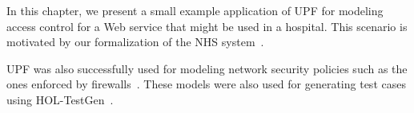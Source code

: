 In this chapter, we present a small example application of UPF for
modeling access control for a Web service that might be used in a
hospital. This scenario is motivated by our formalization of the NHS
system~\cite{bruegger:generation:2012,brucker.ea:model-based:2011}. 

UPF was also successfully used for modeling network security policies
such as the ones enforced by
firewalls~\cite{bruegger:generation:2012,brucker.ea:formal-fw-testing:2014}. These
models were also used for generating test cases using
HOL-TestGen~\cite{brucker.ea:theorem-prover:2012}.
